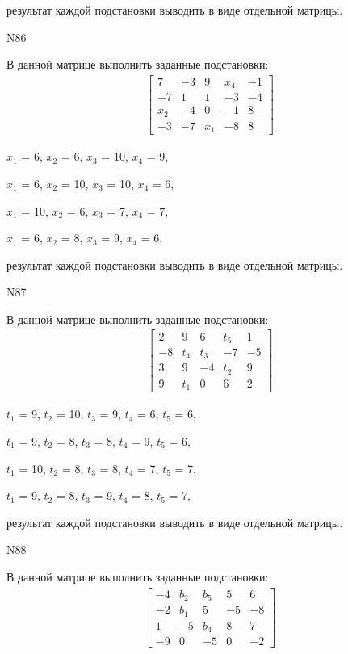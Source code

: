 \documentclass[11pt]{report}
\begin{document}
результат каждой подстановки выводить в виде отдельной матрицы.

N86

В данной матрице выполнить заданные подстановки:
\begin{align*}
\left[\begin{matrix}7 & -3 & 9 & x_{4} & -1\\-7 & 1 & 1 & -3 & -4\\x_{2} & -4 & 0 & -1 & 8\\-3 & -7 & x_{1} & -8 & 8\end{matrix}\right]
\end{align*}


$x_{1}$ = 6, $x_{2}$ = 6, $x_{3}$ = 10, $x_{4}$ = 9, 

$x_{1}$ = 6, $x_{2}$ = 10, $x_{3}$ = 10, $x_{4}$ = 6, 

$x_{1}$ = 10, $x_{2}$ = 6, $x_{3}$ = 7, $x_{4}$ = 7, 

$x_{1}$ = 6, $x_{2}$ = 8, $x_{3}$ = 9, $x_{4}$ = 6, 

результат каждой подстановки выводить в виде отдельной матрицы.

N87

В данной матрице выполнить заданные подстановки:
\begin{align*}
\left[\begin{matrix}2 & 9 & 6 & t_{5} & 1\\-8 & t_{4} & t_{3} & -7 & -5\\3 & 9 & -4 & t_{2} & 9\\9 & t_{1} & 0 & 6 & 2\end{matrix}\right]
\end{align*}


$t_{1}$ = 9, $t_{2}$ = 10, $t_{3}$ = 9, $t_{4}$ = 6, $t_{5}$ = 6, 

$t_{1}$ = 9, $t_{2}$ = 8, $t_{3}$ = 8, $t_{4}$ = 9, $t_{5}$ = 6, 

$t_{1}$ = 10, $t_{2}$ = 8, $t_{3}$ = 8, $t_{4}$ = 7, $t_{5}$ = 7, 

$t_{1}$ = 9, $t_{2}$ = 8, $t_{3}$ = 9, $t_{4}$ = 8, $t_{5}$ = 7, 

результат каждой подстановки выводить в виде отдельной матрицы.

N88

В данной матрице выполнить заданные подстановки:
\begin{align*}
\left[\begin{matrix}-4 & b_{2} & b_{5} & 5 & 6\\-2 & b_{1} & 5 & -5 & -8\\1 & -5 & b_{4} & 8 & 7\\-9 & 0 & -5 & 0 & -2\end{matrix}\right]
\end{align*}
\end{document}
